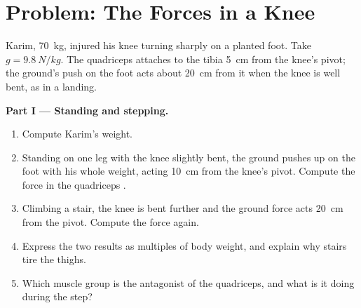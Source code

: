 \section{Problem: The Forces in a Knee}

\begin{problem}
\label{pb:g10:muscles-and-joints:1}
Karim, \qty{70}{kg}, injured his knee turning sharply on a planted
foot. Take $g = \qty{9.8}{N/kg}$. The quadriceps  attaches to
the tibia \qty{5}{cm} from the knee's pivot; the ground's push on the
foot acts about \qty{20}{cm} from it when the knee is well bent, as
in a landing.

\medskip
\noindent\textbf{Part I --- Standing and stepping.}
\begin{enumerate}
  \item Compute Karim's weight.
  \item Standing on one leg with the knee slightly bent, the ground
        pushes up on the foot with his whole weight, acting
        \qty{10}{cm} from the knee's pivot. Compute the force in the
        quadriceps .
  \item Climbing a stair, the knee is bent further and the ground
        force acts \qty{20}{cm} from the pivot. Compute the 
        force again.
  \item Express the two results as multiples of body weight, and
        explain why stairs tire the thighs.
  \item Which muscle group is the antagonist of the quadriceps, and
        what is it doing during the step?
\end{enumerate}


\end{problem}
